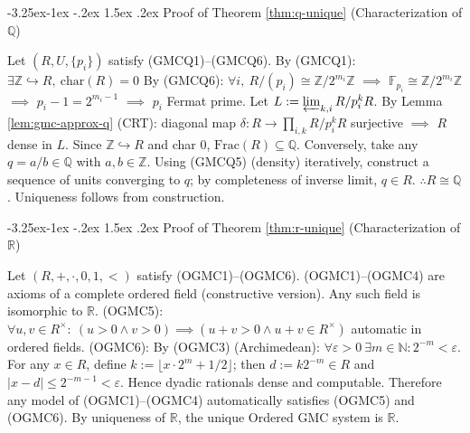\documentclass[12pt]{amsart}
\makeatletter
\theoremstyle{break}
\renewcommand\subsection{\@startsection{subsection}{2}{\z@}%
	{-3.25ex\@plus -1ex \@minus -.2ex}%
	{1.5ex \@plus .2ex}%
	{\normalfont\large\bfseries}}
\makeatother
\begin{document}
\subsection{Proof of Theorem \ref{thm:q-unique} (Characterization of \(\mathbb{Q}\))}
\begin{algorithmic}[1]
\State Let \((R,U,\{p_i\})\) satisfy (GMCQ1)–(GMCQ6).
\State By (GMCQ1): \(\exists\mathbb{Z}\hookrightarrow R,\ \mathrm{char}(R)=0\)
\State By (GMCQ6): \(\forall i,\ R/(p_i)\cong\mathbb{Z}/2^{m_i}\mathbb{Z}\) \(\implies\) \(\mathbb{F}_{p_i}\cong\mathbb{Z}/2^{m_i}\mathbb{Z}\) \(\implies\) \(p_i-1=2^{m_i-1}\) \(\implies\) \(p_i\) Fermat prime.
\State Let \(L:=\varprojlim_{k,i}R/p_i^kR\).
\State By Lemma \ref{lem:gmc-approx-q} (CRT): diagonal map \(\delta:R\to\prod_{i,k}R/p_i^kR\) surjective \(\implies\) \(R\) dense in \(L\).
\State Since \(\mathbb{Z}\hookrightarrow R\) and char 0, \(\mathrm{Frac}(R)\subseteq\mathbb{Q}\).
\State Conversely, take any \(q=a/b\in\mathbb{Q}\) with \(a,b\in\mathbb{Z}\). Using (GMCQ5) (density) iteratively, construct a sequence of units converging to \(q\); by completeness of inverse limit, \(q\in R\).
\State \(\therefore R\cong\mathbb{Q}\).
\State Uniqueness follows from construction.
\end{algorithmic}



\subsection{Proof of Theorem \ref{thm:r-unique} (Characterization of \(\mathbb{R}\))}
\begin{algorithmic}[1]
\State Let \((R,+,\cdot,0,1,<)\) satisfy (OGMC1)–(OGMC6).
\State (OGMC1)–(OGMC4) are axioms of a complete ordered field (constructive version). Any such field is isomorphic to \(\mathbb{R}\).
\State (OGMC5):{ \small \(\forall u,v\in R^{\times}:\ (u>0\land v>0)\implies(u+v>0\land u+v\in R^{\times})\) \scriptsize automatic in ordered fields.}\normalsize
\State (OGMC6): By (OGMC3) (Archimedean): \(\forall\varepsilon>0\ \exists m\in\mathbb{N}:2^{-m}<\varepsilon\).\text{ \ }\hspace{80pt}\text{ \ \ \ } For any \(x\in R\), define \(k:=\lfloor x\cdot2^m+1/2\rfloor\); then \(d:=k2^{-m}\in R\) and \(|x-d|\le2^{-m-1}<\varepsilon\). Hence dyadic rationals dense and computable.
\State Therefore any model of (OGMC1)–(OGMC4) automatically satisfies (OGMC5) and (OGMC6). By uniqueness of \(\mathbb{R}\), the unique Ordered GMC system is \(\mathbb{R}\).
\end{algorithmic}
\end{document}
